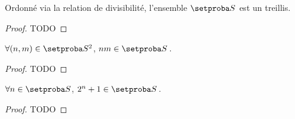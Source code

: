 \begin{fact}
	Ordonné via la relation de divisibilité, l'ensemble $\ourset$ est un treillis.
\end{fact}

\begin{proof}
	TODO
\end{proof}




\begin{fact}
	$\forall (n , m) \in \ourset^2$, $n m \in \ourset$\,.
\end{fact}

\begin{proof}
	TODO
\end{proof}




\begin{fact}
	$\forall n \in \ourset$, $2^n + 1 \in \ourset$\,.
\end{fact}

\begin{proof}
	TODO
\end{proof}


